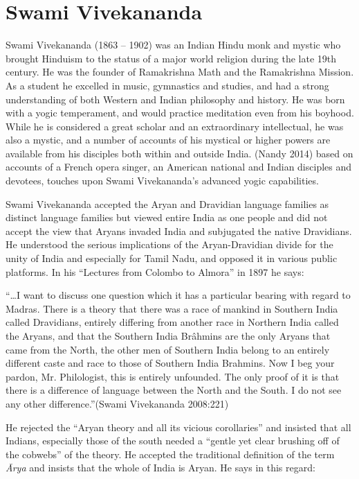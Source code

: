 \section*{Swami Vivekananda}

Swami Vivekananda (1863 – 1902) was an Indian Hindu monk and mystic who brought Hinduism to the status of a major world religion during the late 19th century. He was the founder of Ramakrishna Math and the Ramakrishna Mission. As a student he excelled in music, gymnastics and studies, and had a strong understanding of both Western and Indian philosophy and history. He was born with a yogic temperament, and would practice meditation even from his boyhood. While he is considered a great scholar and an extraordinary intellectual, he was also a mystic, and a number of accounts of his mystical or higher powers are available from his disciples both within and outside India. (Nandy 2014) based on accounts of a French opera singer, an American national and Indian disciples and devotees, touches upon Swami Vivekananda’s advanced yogic capabilities.

Swami Vivekananda accepted the Aryan and Dravidian language families as distinct language families but viewed entire India as one people and did not accept the view that Aryans invaded India and subjugated the native Dravidians. He understood the serious implications of the Aryan-Dravidian divide for the unity of India and especially for Tamil Nadu, and opposed it in various public platforms. In his “Lectures from Colombo to Almora” in 1897 he says:

\begin{myquote}
“…I want to discuss one question which it has a particular bearing with regard to Madras. There is a theory that there was a race of mankind in Southern India called Dravidians, entirely differing from another race in Northern India called the Aryans, and that the Southern India Brâhmins are the only Aryans that came from the North, the other men of Southern India belong to an entirely different caste and race to those of Southern India Brahmins. Now I beg your pardon, Mr. Philologist, this is entirely unfounded. The only proof of it is that there is a difference of language between the North and the South. I do not see any other difference.”(Swami Vivekananda 2008:221)
\end{myquote}

He rejected the “Aryan theory and all its vicious corollaries” and insisted that all Indians, especially those of the south needed a “gentle yet clear brushing off of the cobwebs” of the theory. He accepted the traditional definition of the term \textit{Ārya} and insists that the whole of India is Aryan. He says in this regard:

